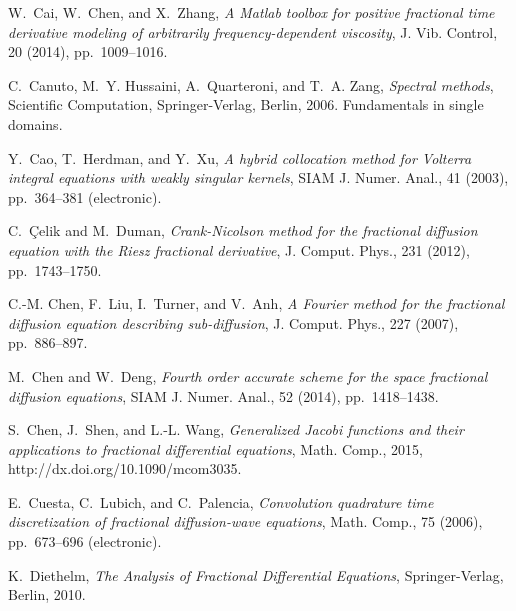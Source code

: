 \documentclass[10pt]{siamltex}
\begin{document}




\begin{thebibliography}{10}


{\sc W.~Cai, W.~Chen, and X.~Zhang}, {\em A {M}atlab toolbox for positive
  fractional time derivative modeling of arbitrarily frequency-dependent
  viscosity}, J. Vib. Control, 20 (2014), pp.~1009--1016.

{\sc C.~Canuto, M.~Y. Hussaini, A.~Quarteroni, and T.~A. Zang}, {\em Spectral
  methods}, Scientific Computation, Springer-Verlag, Berlin, 2006.
\newblock Fundamentals in single domains.

{\sc Y.~Cao, T.~Herdman, and Y.~Xu}, {\em A hybrid collocation method for
  {V}olterra integral equations with weakly singular kernels}, SIAM J. Numer.
  Anal., 41 (2003), pp.~364--381 (electronic).

{\sc C.~{\c{C}}elik and M.~Duman}, {\em Crank-{N}icolson method for the
  fractional diffusion equation with the {R}iesz fractional derivative}, J.
  Comput. Phys., 231 (2012), pp.~1743--1750.

{\sc C.-M. Chen, F.~Liu, I.~Turner, and V.~Anh}, {\em A {F}ourier method for
  the fractional diffusion equation describing sub-diffusion}, J. Comput.
  Phys., 227 (2007), pp.~886--897.

{\sc M.~Chen and W.~Deng}, {\em Fourth order accurate scheme for the space
  fractional diffusion equations}, SIAM J. Numer. Anal., 52 (2014),
  pp.~1418--1438.

{\sc S.~Chen, J.~Shen, and L.-L. Wang}, {\em Generalized {J}acobi functions and
  their applications to fractional differential equations},
  Math.   Comp., 2015,  http://dx.doi.org/10.1090/mcom3035.

{\sc E.~Cuesta, C.~Lubich, and C.~Palencia}, {\em Convolution quadrature time
  discretization of fractional diffusion-wave equations}, Math. Comp., 75
  (2006), pp.~673--696 (electronic).

{\sc K.~Diethelm}, {\em The Analysis of Fractional Differential Equations}, Springer-Verlag, Berlin, 2010.



\end{thebibliography}
\end{document}
